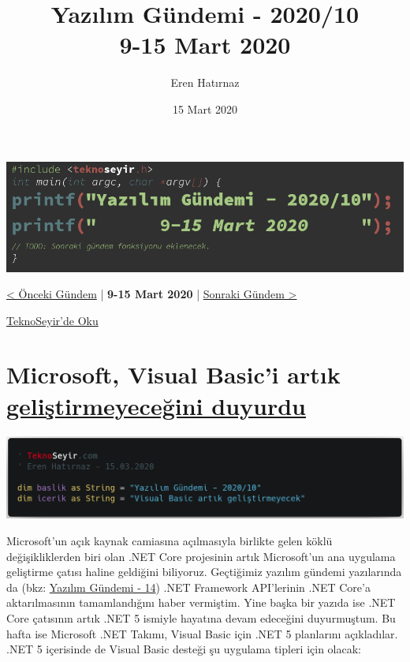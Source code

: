 \documentclass[11pt]{article}
\author{Eren Hatırnaz}
\date{15 Mart 2020}
\title{Yazılım Gündemi - 2020/10\\\medskip
\large 9-15 Mart 2020}
\begin{document}
\maketitle
\tableofcontents \clearpage\shorthandoff{=}

\begin{center}
\includegraphics[width=.9\linewidth]{gorseller/yazilim-gundemi-banner.png}
\end{center}

\begin{center}
\href{../09/yazilim-gundemi-2020-09.pdf}{< Önceki Gündem} | \textbf{9-15 Mart 2020} | \href{../11/yazilim-gundemi-2020-11.pdf}{Sonraki Gündem >}

\href{https://teknoseyir.com/blog/yazilim-gundemi-2020-10}{TeknoSeyir'de Oku}
\end{center}

\section{Microsoft, Visual Basic'i artık \href{https://devblogs.microsoft.com/vbteam/visual-basic-support-planned-for-net-5-0/}{geliştirmeyeceğini duyurdu}}
\label{sec:orgd0f8a34}
\begin{center}
\includegraphics[width=.9\linewidth]{gorseller/visual-basic-gelistirme.png}
\end{center}

Microsoft'un açık kaynak camiasına açılmasıyla birlikte gelen köklü
değişikliklerden biri olan .NET Core projesinin artık Microsoft'un ana
uygulama geliştirme çatısı haline geldiğini biliyoruz. Geçtiğimiz yazılım
gündemi yazılarında da (bkz: \href{../../2019/14/yazilim-gundemi-14.pdf}{Yazılım Gündemi - 14}) .NET Framework API'lerinin
.NET Core'a aktarılmasının tamamlandığını haber vermiştim. Yine başka bir
yazıda ise .NET Core çatısının artık .NET 5 ismiyle hayatına devam edeceğini
duyurmuştum. Bu hafta ise Microsoft .NET Takımı, Visual Basic için .NET 5
planlarını açıkladılar. .NET 5 içerisinde de Visual Basic desteği şu uygulama
tipleri için olacak:
\end{document}
